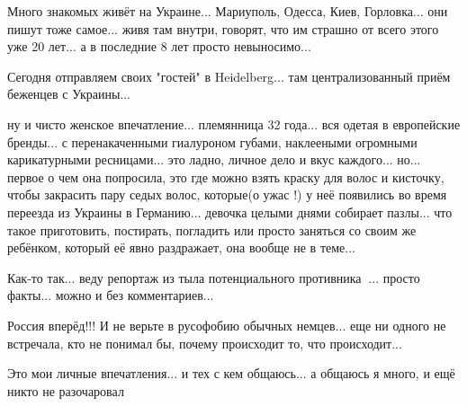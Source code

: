 Много знакомых живёт на Украине... Мариуполь, Одесса, Киев, Горловка... они пишут тоже самое... живя там внутри, говорят, что им страшно от всего этого уже 20 лет... а в последние 8 лет просто невыносимо...

Сегодня отправляем своих "гостей" в Heidelberg... там централизованный приём беженцев с Украины...

ну и чисто женское впечатление... племянница 32 года... вся одетая в европейские бренды... с перенакаченными гиалуроном губами, наклееными огромными карикатурными ресницами... это ладно, личное дело и вкус каждого... но... первое о чем она попросила, это где можно взять краску для волос и кисточку, чтобы закрасить пару седых волос, которые(о ужас !) у неё появились во время переезда из Украины в Германию... девочка целыми днями собирает пазлы... что такое приготовить, постирать, погладить или просто заняться со своим же ребёнком, который её явно раздражает, она вообще не в теме...

Как-то так... веду репортаж из тыла потенциального противника🤦‍♀... просто факты... можно и без комментариев...

Россия вперёд!!! И не верьте в русофобию обычных немцев... еще ни одного не встречала, кто не понимал бы, почему происходит то, что происходит...

Это мои личные впечатления... и тех с кем общаюсь... а общаюсь я много, и ещё никто не разочаровал
